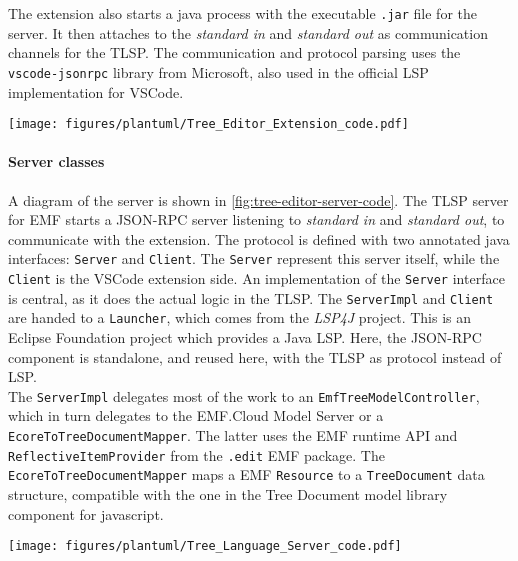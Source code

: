 The extension also starts a java process with the executable \texttt{.jar} file for the server.
It then attaches to the \textit{standard in} and \textit{standard out} as communication channels for the \acrshort{TLSP}.
The communication and protocol parsing uses the \texttt{vscode-jsonrpc} library from Microsoft, also used in the official \acrshort{LSP} implementation for \gls{VSCode}.

\begin{sidewaysfigure}[htbp]  %
  \centering
  \texttt{[image: figures/plantuml/Tree\_Editor\_Extension\_code.pdf]}
  \caption[Tree Editor Extension class diagram]{Class diagram of the Tree Editor Extension component.}\label{fig:tree-editor-extension-code}
\end{sidewaysfigure}

\FloatBarrier

\paragraph{Server classes}
A diagram of the server is shown in \cref{fig:tree-editor-server-code}.
The \acrshort{TLSP} server for \acrshort{EMF} starts a \gls{JSON-RPC} server listening to \textit{standard in} and \textit{standard out}, to communicate with the extension.
The protocol is defined with two annotated java interfaces: \texttt{Server} and \texttt{Client}.
The \texttt{Server} represent this server itself, while the \texttt{Client} is the \gls{VSCode} extension side.
An implementation of the \texttt{Server} interface is central, as it does the actual logic in the \acrlong{TLSP}.
The \texttt{ServerImpl} and \texttt{Client} are handed to a \texttt{Launcher}, which comes from the \textit{LSP4J} project.
This is an Eclipse Foundation project which provides a Java \acrshort{LSP}.
Here, the \gls{JSON-RPC} component is standalone, and reused here, with the \acrshort{TLSP} as protocol instead of \acrshort{LSP}.\\

The \texttt{ServerImpl} delegates most of the work to an \texttt{EmfTreeModelController}, which in turn delegates to the EMF.Cloud Model Server or a \texttt{EcoreToTreeDocumentMapper}.
The latter uses the \acrshort{EMF} runtime \acrshort{API} and \texttt{ReflectiveItemProvider} from the \texttt{.edit} \acrshort{EMF} package.
The \texttt{EcoreToTreeDocumentMapper} maps a \acrshort{EMF} \texttt{Resource} to a \texttt{TreeDocument} data structure, compatible with the one in the Tree Document model library component for javascript.

\begin{sidewaysfigure}[htbp]  %
  \centering
  \texttt{[image: figures/plantuml/Tree\_Language\_Server\_code.pdf]}
  \caption[Tree Language Server class diagram]{Class diagram of the Tree Language Server component.}\label{fig:tree-editor-server-code}
\end{sidewaysfigure}

\FloatBarrier
